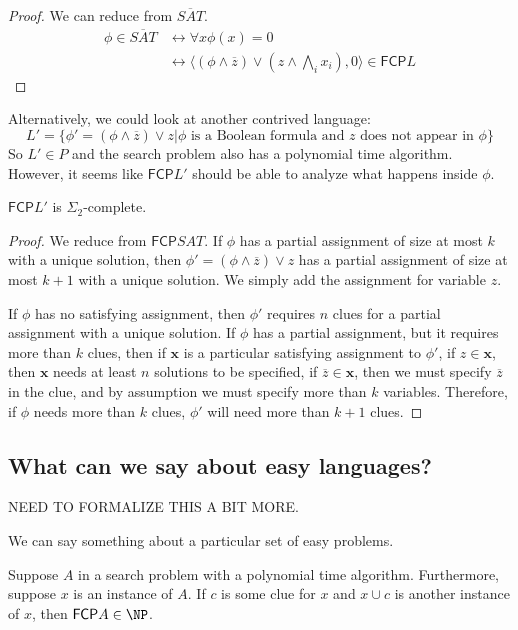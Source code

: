 \documentclass[runningheads,a4paper]{llncs}
\begin{document}
\begin{proof}
We can reduce from $\overline{SAT}$. 
\begin{align}
\phi \in \overline{SAT} &\leftrightarrow \forall x \phi(x) = 0 \\
				    & \leftrightarrow \langle (\phi \wedge \overline{z}) \vee \left(z \wedge \bigwedge_i x_i \right), 0 \rangle \in \mathsf{FCP} L
\end{align}
\end{proof}

Alternatively, we could look at another contrived language:
\[ L' = \{ \phi' = (\phi \wedge \overline{z}) \vee z | \phi \text{ is a Boolean formula and $z$ does not appear in $\phi$} \} \]
So $L' \in P$ and the search problem also has a polynomial time algorithm. However, it seems like $\mathsf{FCP} L'$ should be able to analyze what happens inside $\phi$. 

\begin{proposition}
$\mathsf{FCP} L'$ is $\Sigma_2$-complete. 
\end{proposition}

\begin{proof}
We reduce from $\mathsf{FCP} SAT$. If $\phi$ has a partial assignment of size at most $k$ with a unique solution, then $\phi' = (\phi \wedge \overline{z}) \vee z$ has a partial assignment of size at most $k+1$ with a unique solution. We simply add the assignment for variable $z$. 

If $\phi$ has no satisfying assignment, then $\phi'$ requires $n$ clues for a partial assignment with a unique solution. If $\phi$ has a partial assignment, but it requires more than $k$ clues, then if $\textbf{x}$ is a particular satisfying assignment to $\phi'$, if $z  \in \textbf{x}$, then $\textbf{x}$ needs at least $n$ solutions to be specified, if $\overline{z} \in \textbf{x}$, then we must specify $\overline{z}$ in the clue, and by assumption we must specify more than $k$ variables. Therefore, if $\phi$ needs more than $k$ clues, $\phi'$ will need more than $k+1$ clues. 
\end{proof}

\subsection{What can we say about easy languages?}

NEED TO FORMALIZE THIS A BIT MORE.

We can say something about a particular set of easy problems. 
\begin{proposition}
Suppose $A$ in a search problem with a polynomial time algorithm. Furthermore, suppose $x$ is an instance of $A$. If $c$ is some clue for $x$ and $x \cup c$ is another instance of $x$, then $\mathsf{FCP} A \in \NP$. 
\end{proposition}
\end{document}
